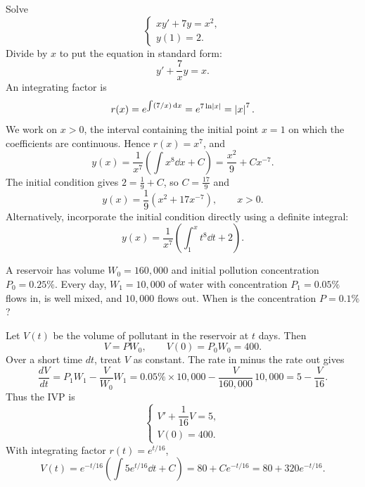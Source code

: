 \begin{example}
  Solve
  \[
    \begin{cases}
      xy'+7y=x^2, \\
      y(1)=2.
    \end{cases}
  \]
  Divide by $x$ to put the equation in standard form:
  \[
    y'+\frac7x y=x.
  \]
  An integrating factor is
  \[
    r(x)=e^{\int (7/x)\,\mathrm{d}x}=e^{7\ln\left\lvert x \right\rvert}=\left\lvert x \right\rvert^7.
  \]
  We work on $x>0$, the interval containing the initial point $x=1$ on which the coefficients are continuous. Hence $r(x)=x^7$, and
  \[
    y(x)=\frac{1}{x^7}\left(\int x^8\dd{x}+C\right)
    =\frac{x^2}{9}+Cx^{-7}.
  \]
  The initial condition gives $2=\tfrac19+C$, so $C=\tfrac{17}{9}$ and
  \[
    y(x)=\frac19\left(x^2+17x^{-7}\right),\qquad x>0.
  \]
  Alternatively, incorporate the initial condition directly using a definite integral:
  \[
    y(x)=\frac{1}{x^7}\left(\int_1^x t^8\dd{t}+2\right).
  \]
\end{example}

\begin{example}
  A reservoir has volume $W_0=160{,}000$ and initial pollution concentration
  $P_0=0.25\%$. Every day, $W_1=10{,}000$ of water with concentration
  $P_1=0.05\%$ flows in, is well mixed, and $10{,}000$ flows out.
  When is the concentration $P=0.1\%$?

  \begin{center}
  \end{center}

  Let $V(t)$ be the volume of pollutant in the reservoir at $t$ days. Then
  \[
    V=PW_0,\qquad V(0)=P_0W_0=400.
  \]
  Over a short time $dt$, treat $V$ as constant. The rate in minus the rate out gives
  \[
    \frac{dV}{dt}=P_1W_1-\frac{V}{W_0}W_1
    =0.05\%\times10{,}000-\frac{V}{160{,}000}\,10{,}000
    =5-\frac{V}{16}.
  \]
  Thus the IVP is
  \[
    \begin{cases}
      V'+\dfrac1{16}V=5, \\
      V(0)=400.
    \end{cases}
  \]
  With integrating factor $r(t)=e^{t/16}$,
  \[
    V(t)=e^{-t/16}\left(\int 5e^{t/16}\dd{t}+C\right)
    =80+Ce^{-t/16}=80+320e^{-t/16}.
  \]
\end{example}

